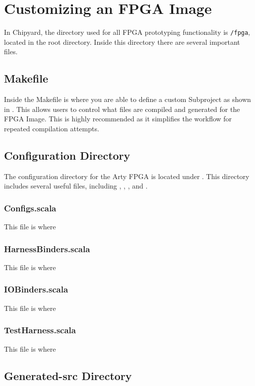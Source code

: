 \section{Customizing an FPGA Image}\label{sec:Customizing}
In Chipyard, the directory used for all FPGA prototyping functionality is \texttt{/fpga}, located in the root directory. 
Inside this directory there are several important files.

\subsection{Makefile}
Inside the Makefile is where you are able to define a custom Subproject as shown in . 
This allows users to control what files are compiled and generated for the FPGA Image. 
This is highly recommended as it simplifies the workflow for repeated compilation attempts.

\subsection{Configuration Directory}
The configuration directory for the Arty FPGA is located under . 
This directory includes several useful files, including , , , and .

\subsubsection{Configs.scala}
This file is where 

\subsubsection{HarnessBinders.scala}
This file is where 

\subsubsection{IOBinders.scala}
This file is where 

\subsubsection{TestHarness.scala}
This file is where 

\subsection{Generated-src Directory}

